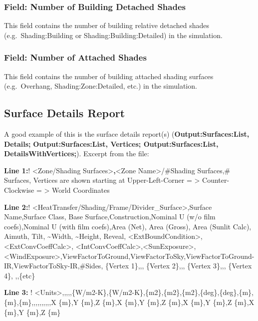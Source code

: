 \subsubsection{Field: Number of Building Detached Shades}\label{field-number-of-building-detached-shades}

This field contains the number of building relative detached shades (e.g.~Shading:Building or Shading:Building:Detailed) in the simulation.

\subsubsection{Field: Number of Attached Shades}\label{field-number-of-attached-shades}

This field contains the number of building attached shading surfaces (e.g.~Overhang, Shading:Zone:Detailed, etc.) in the simulation.

\subsection{Surface Details Report}\label{surface-details-report}

A good example of this is the surface details report(s) (\textbf{Output:Surfaces:List, Details;} \textbf{Output:Surfaces:List, Vertices; Output:Surfaces:List, DetailsWithVertices;}). Excerpt from the file:

\textbf{Line 1:}! \textless{}Zone/Shading Surfaces\textgreater{}\textbf{,}\textless{}Zone Name\textgreater{}/\#Shading Surfaces,\# Surfaces, Vertices are shown starting at Upper-Left-Corner = \textgreater{} Counter-Clockwise = \textgreater{} World Coordinates

\textbf{Line 2:}! \textless{}HeatTransfer/Shading/Frame/Divider\_Surface\textgreater{},Surface Name,Surface Class, Base Surface,Construction,Nominal U (w/o film coefs),Nominal U (with film coefs),Area (Net), Area (Gross), Area (Sunlit Calc), Aimuth, Tilt, \textasciitilde{}Width, \textasciitilde{}Height, Reveal, \textless{}ExtBoundCondition\textgreater{}, \textless{}ExtConvCoeffCalc\textgreater{}, \textless{}IntConvCoeffCalc\textgreater{},\textless{}SunExposure\textgreater{},\textless{}WindExposure\textgreater{},ViewFactorToGround,ViewFactorToSky,ViewFactorToGround-IR,ViewFactorToSky-IR,\#Sides, \{Vertex 1\},,, \{Vertex 2\},,, \{Vertex 3\},,, \{Vertex 4\}, ,,\{etc\}

\textbf{Line 3:} ! \textless{}Units\textgreater{},,,,,\{W/m2-K\},\{W/m2-K\},\{m2\},\{m2\},\{m2\},\{deg\},\{deg\},\{m\},\{m\},\{m\},,,,,,,,,,X \{m\},Y \{m\},Z \{m\},X \{m\},Y \{m\},Z \{m\},X \{m\},Y \{m\},Z \{m\},X \{m\},Y \{m\},Z \{m\}


